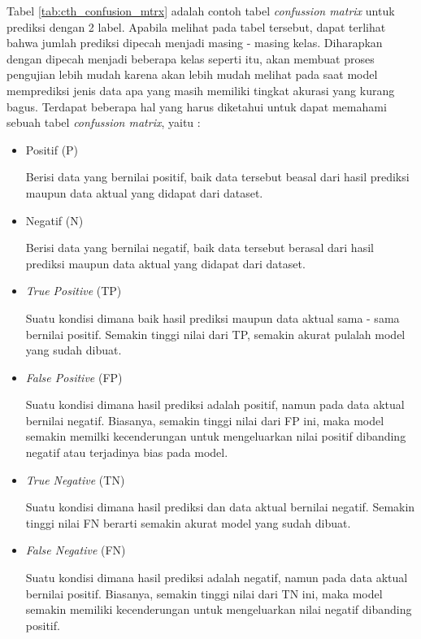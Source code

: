 Tabel \ref{tab:cth_confusion_mtrx} adalah contoh tabel \textit{confussion matrix} untuk prediksi dengan 2 label. Apabila melihat pada tabel tersebut, dapat terlihat bahwa jumlah prediksi dipecah menjadi masing - masing kelas. Diharapkan dengan dipecah menjadi beberapa kelas seperti itu, akan membuat proses pengujian lebih mudah karena akan lebih mudah melihat pada saat model memprediksi jenis data apa yang masih memiliki tingkat akurasi yang kurang bagus. Terdapat beberapa hal yang harus diketahui untuk dapat memahami sebuah tabel \textit{confussion matrix}, yaitu :

\begin{itemize}[nolistsep]
    \item Positif (P)

          Berisi data yang bernilai positif, baik data tersebut beasal dari hasil prediksi maupun data aktual yang didapat dari dataset.

    \item Negatif (N)

          Berisi data yang bernilai negatif, baik data tersebut berasal dari hasil prediksi maupun data aktual yang didapat dari dataset.

    \item \textit{True Positive} (TP)

          Suatu kondisi dimana baik hasil prediksi maupun data aktual sama - sama bernilai positif. Semakin tinggi nilai dari TP, semakin akurat pulalah model yang sudah dibuat.

    \item \textit{False Positive} (FP)

          Suatu kondisi dimana hasil prediksi adalah positif, namun pada data aktual bernilai negatif. Biasanya, semakin tinggi nilai dari FP ini, maka model semakin memilki kecenderungan untuk mengeluarkan nilai positif dibanding negatif atau terjadinya bias pada model.

    \item \textit{True Negative} (TN)

          Suatu kondisi dimana hasil prediksi dan data aktual bernilai negatif. Semakin tinggi nilai FN berarti semakin akurat model yang sudah dibuat.

    \item \textit{False Negative} (FN)

          Suatu kondisi dimana hasil prediksi adalah negatif, namun pada data aktual bernilai positif. Biasanya, semakin tinggi nilai dari TN ini, maka model semakin memiliki kecenderungan untuk mengeluarkan nilai negatif dibanding positif.


\end{itemize}

